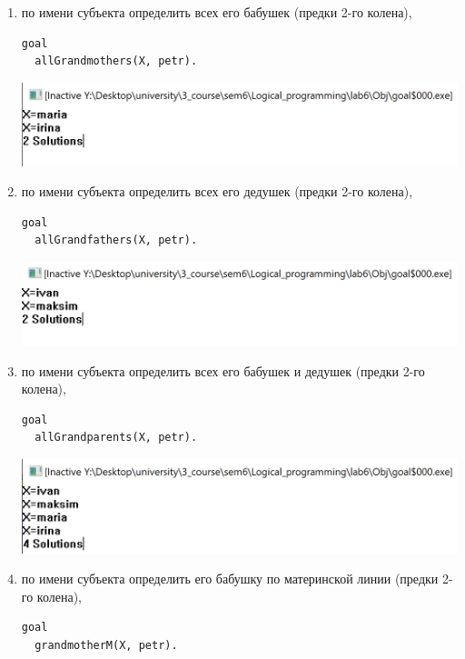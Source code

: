 \documentclass[a4paper,14pt]{extreport} %
\begin{document}
\begin{enumerate}
\item по имени субъекта определить всех его бабушек (предки 2-го колена),

\begin{lstlisting}
goal
  allGrandmothers(X, petr).
\end{lstlisting}

\includegraphics[scale=0.8]{ex1}

\item по имени субъекта определить всех его дедушек (предки 2-го колена),

\begin{lstlisting}
goal
  allGrandfathers(X, petr).
\end{lstlisting}

\includegraphics[scale=0.8]{ex2}

\item по имени субъекта определить всех его бабушек и дедушек (предки 2-го колена),

\begin{lstlisting}
goal
  allGrandparents(X, petr).
\end{lstlisting}

\includegraphics[scale=0.8]{ex3}

\item по имени субъекта определить его бабушку по материнской линии (предки 2-го колена),

\begin{lstlisting}
goal
  grandmotherM(X, petr).
\end{lstlisting}


\end{enumerate}
\end{document}

